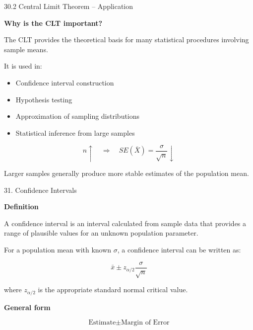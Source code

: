 \begin{frame}{30.2 Central Limit Theorem -- Application}

\textbf{Why is the CLT important?}

The CLT provides the theoretical basis for many statistical
procedures involving sample means.

\vspace{0.4cm}

It is used in:

\begin{itemize}
    \item Confidence interval construction
    \item Hypothesis testing
    \item Approximation of sampling distributions
    \item Statistical inference from large samples
\end{itemize}

\vspace{0.4cm}

\[
\boxed{
n\uparrow
\quad\Rightarrow\quad
SE(\bar{X})=\frac{\sigma}{\sqrt n}\downarrow
}
\]

\vspace{0.2cm}

Larger samples generally produce more stable estimates of
the population mean.

\end{frame}



\begin{frame}{31. Confidence Intervals}

\textbf{Definition}

A confidence interval is an interval calculated from sample
data that provides a range of plausible values for an unknown
population parameter.

\vspace{0.4cm}

For a population mean with known $\sigma$, a confidence interval
can be written as:

\[
\boxed{
\bar{x}
\pm
z_{\alpha/2}
\frac{\sigma}{\sqrt n}
}
\]

where $z_{\alpha/2}$ is the appropriate standard normal
critical value.

\vspace{0.3cm}

\textbf{General form}

\[
\boxed{
\text{Estimate}
\pm
\text{Margin of Error}
}
\]

\end{frame}


